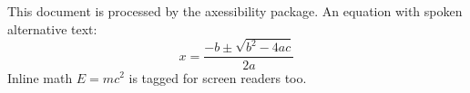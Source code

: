 \documentclass{article}
\begin{document}
This document is processed by the axessibility package.
An equation with spoken alternative text:
\begin{equation}
x = \frac{-b \pm \sqrt{b^2-4ac}}{2a}
\end{equation}
Inline math $E = mc^2$ is tagged for screen readers too.
\end{document}
